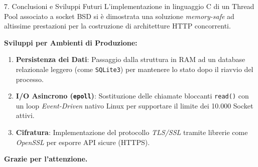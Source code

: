 \documentclass[aspectratio=169, 10pt]{beamer}
\begin{document}
\begin{frame}{7. Conclusioni e Sviluppi Futuri}
    L'implementazione in linguaggio C di un Thread Pool associato a socket BSD si è dimostrata una soluzione \textit{memory-safe} ad altissime prestazioni per la costruzione di architetture HTTP concorrenti.

    \vspace{0.4cm}
    \textbf{Sviluppi per Ambienti di Produzione:}
    \begin{enumerate}
        \item \textbf{Persistenza dei Dati}: Passaggio dalla struttura in RAM ad un database relazionale leggero (come \texttt{SQLite3}) per mantenere lo stato dopo il riavvio del processo.
        \item \textbf{I/O Asincrono (\texttt{epoll})}: Sostituzione delle chiamate bloccanti \texttt{read()} con un loop \textit{Event-Driven} nativo Linux per supportare il limite dei 10.000 Socket attivi.
        \item \textbf{Cifratura}: Implementazione del protocollo \textit{TLS/SSL} tramite librerie come \textit{OpenSSL} per esporre API sicure (HTTPS).
    \end{enumerate}
    
    \vspace{0.5cm}
    \centering
    \Large \textbf{Grazie per l'attenzione.}
\end{frame}
\end{document}

